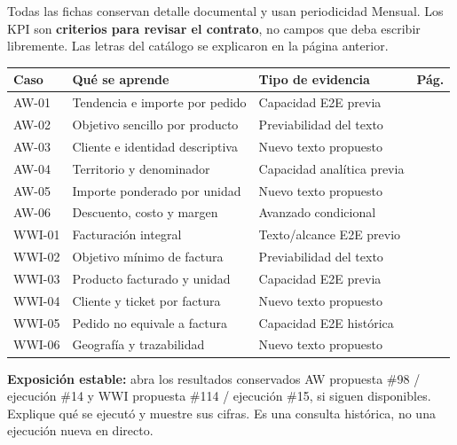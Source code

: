 Todas las fichas conservan detalle documental y usan periodicidad Mensual. Los KPI son \textbf{criterios para revisar el contrato}, no campos que deba escribir libremente. Las letras del catálogo se explicaron en la página anterior.
\begin{tabularx}{\linewidth}{@{}p{18mm}Yp{41mm}r@{}}
\toprule
\textbf{Caso}&\textbf{Qué se aprende}&\textbf{Tipo de evidencia}&\textbf{Pág.}\\
\midrule
AW-01&Tendencia e importe por pedido&Capacidad E2E previa&\pageref{aw01}\\
AW-02&Objetivo sencillo por producto&Previabilidad del texto&\pageref{aw02}\\
AW-03&Cliente e identidad descriptiva&Nuevo texto propuesto&\pageref{aw03}\\
AW-04&Territorio y denominador&Capacidad analítica previa&\pageref{aw04}\\
AW-05&Importe ponderado por unidad&Nuevo texto propuesto&\pageref{aw05}\\
AW-06&Descuento, costo y margen&Avanzado condicional&\pageref{aw06}\\
\midrule
WWI-01&Facturación integral&Texto/alcance E2E previo&\pageref{wwi01}\\
WWI-02&Objetivo mínimo de factura&Previabilidad del texto&\pageref{wwi02}\\
WWI-03&Producto facturado y unidad&Capacidad E2E previa&\pageref{wwi03}\\
WWI-04&Cliente y ticket por factura&Nuevo texto propuesto&\pageref{wwi04}\\
WWI-05&Pedido no equivale a factura&Capacidad E2E histórica&\pageref{wwi05}\\
WWI-06&Geografía y trazabilidad&Nuevo texto propuesto&\pageref{wwi06}\\
\bottomrule
\end{tabularx}
\textbf{Exposición estable:} abra los resultados conservados AW propuesta \#98 / ejecución \#14 y WWI propuesta \#114 / ejecución \#15, si siguen disponibles. Explique qué se ejecutó y muestre sus cifras. Es una consulta histórica, no una ejecución nueva en directo.

